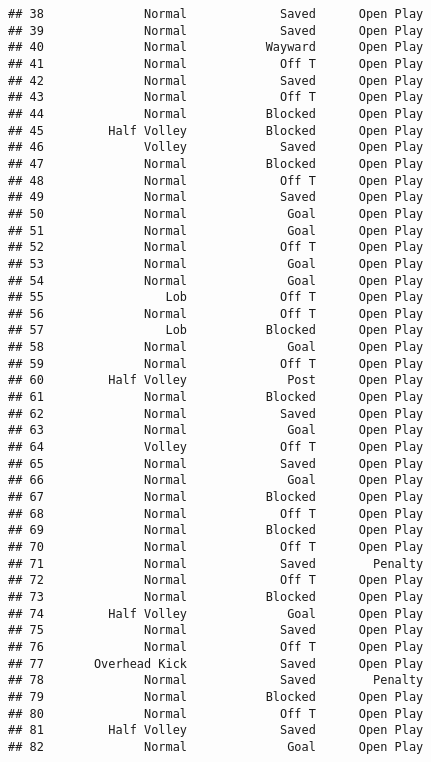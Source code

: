 \documentclass[]{article}
\begin{document}
\begin{verbatim}
## 38              Normal             Saved      Open Play
## 39              Normal             Saved      Open Play
## 40              Normal           Wayward      Open Play
## 41              Normal             Off T      Open Play
## 42              Normal             Saved      Open Play
## 43              Normal             Off T      Open Play
## 44              Normal           Blocked      Open Play
## 45         Half Volley           Blocked      Open Play
## 46              Volley             Saved      Open Play
## 47              Normal           Blocked      Open Play
## 48              Normal             Off T      Open Play
## 49              Normal             Saved      Open Play
## 50              Normal              Goal      Open Play
## 51              Normal              Goal      Open Play
## 52              Normal             Off T      Open Play
## 53              Normal              Goal      Open Play
## 54              Normal              Goal      Open Play
## 55                 Lob             Off T      Open Play
## 56              Normal             Off T      Open Play
## 57                 Lob           Blocked      Open Play
## 58              Normal              Goal      Open Play
## 59              Normal             Off T      Open Play
## 60         Half Volley              Post      Open Play
## 61              Normal           Blocked      Open Play
## 62              Normal             Saved      Open Play
## 63              Normal              Goal      Open Play
## 64              Volley             Off T      Open Play
## 65              Normal             Saved      Open Play
## 66              Normal              Goal      Open Play
## 67              Normal           Blocked      Open Play
## 68              Normal             Off T      Open Play
## 69              Normal           Blocked      Open Play
## 70              Normal             Off T      Open Play
## 71              Normal             Saved        Penalty
## 72              Normal             Off T      Open Play
## 73              Normal           Blocked      Open Play
## 74         Half Volley              Goal      Open Play
## 75              Normal             Saved      Open Play
## 76              Normal             Off T      Open Play
## 77       Overhead Kick             Saved      Open Play
## 78              Normal             Saved        Penalty
## 79              Normal           Blocked      Open Play
## 80              Normal             Off T      Open Play
## 81         Half Volley             Saved      Open Play
## 82              Normal              Goal      Open Play

\end{verbatim}
\end{document}
